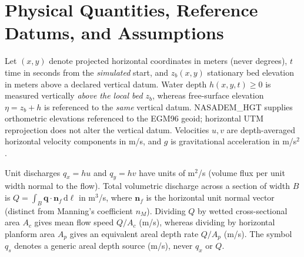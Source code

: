 \documentclass[11pt,a4paper]{article}
\newcommand{\dd}{\mathrm d}
\begin{document}
\section{Physical Quantities, Reference Datums, and Assumptions}
\label{sec:simbolos}
Let $(x,y)$ denote projected horizontal coordinates in meters (never degrees), $t$ time in seconds from the \emph{simulated} start, and $z_b(x,y)$ stationary bed elevation in meters above a declared vertical datum. Water depth $h(x,y,t)\geq0$ is measured vertically \emph{above the local bed} $z_b$, whereas free-surface elevation $\eta=z_b+h$ is referenced to the \emph{same} vertical datum. NASADEM\_HGT supplies orthometric elevations referenced to the EGM96 geoid; horizontal UTM reprojection does not alter the vertical datum. Velocities $u,v$ are depth-averaged horizontal velocity components in m/s, and $g$ is gravitational acceleration in m/s$^2$.

Unit discharges $q_x=hu$ and $q_y=hv$ have units of m$^2$/s (volume flux per unit width normal to the flow). Total volumetric discharge across a section of width $B$ is $Q=\int_B\boldsymbol q\cdot\boldsymbol n_{\!f}\,\dd\ell$ in m$^3$/s, where $\boldsymbol n_{\!f}$ is the horizontal unit normal vector (distinct from Manning's coefficient $n_M$). Dividing $Q$ by wetted cross-sectional area $A_c$ gives mean flow speed $Q/A_c$ (m/s), whereas dividing by horizontal planform area $A_p$ gives an equivalent areal depth rate $Q/A_p$ (m/s). The symbol $q_s$ denotes a generic areal depth source (m/s), never $q_x$ or $Q$.
\end{document}
